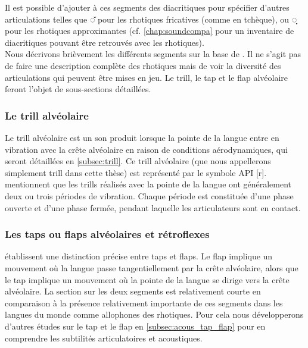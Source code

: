 Il est possible d'ajouter à ces segments des diacritiques pour spécifier d'autres articulations telles que {◌̌  } pour les rhotiques fricatives (comme en tchèque), ou {◌̞} pour les rhotiques approximantes (cf. \autoref{chap:soundcompa} pour un inventaire de diacritiques pouvant être retrouvés avec les rhotiques).\\ 

Nous décrivons brièvement les différents segments sur la base de \textcite{ladefogedSoundsWorldLanguages1996}. Il ne s'agit pas de faire une description complète des rhotiques mais de voir la diversité des articulations qui peuvent être mises en jeu. Le trill, le tap et le flap alvéolaire feront l'objet de sous-sections détaillées.

\subsubsection{Le trill alvéolaire}

Le trill alvéolaire est un son produit lorsque la pointe de la langue entre en vibration avec la crête alvéolaire en raison de conditions aérodynamiques, qui seront détaillées en \autoref{subsec:trill}. Ce trill alvéolaire (que nous appellerons simplement trill dans cette thèse) est représenté par le symbole API [r]. \textcite[218]{ladefogedSoundsWorldLanguages1996} mentionnent que les trills réalisés avec la pointe de la langue ont généralement deux ou trois périodes de vibration. Chaque période est constituée d'une phase ouverte et d'une phase fermée, pendant laquelle les articulateurs sont en contact.

\subsubsection{Les taps ou flaps alvéolaires et rétroflexes}

\textcite[231]{ladefogedSoundsWorldLanguages1996} établissent une distinction précise entre taps et flaps. Le flap implique un mouvement où la langue passe tangentiellement par la crête alvéolaire, alors que le tap implique un mouvement où la pointe de la langue se dirige vers la crête alvéolaire. La section sur les deux segments est relativement courte en comparaison à la présence relativement importante de ces segments dans les langues du monde comme allophones des rhotiques. Pour cela nous développerons d'autres études sur le tap et le flap en \autoref{subsec:acous_tap_flap} pour en comprendre les subtilités articulatoires et acoustiques.


